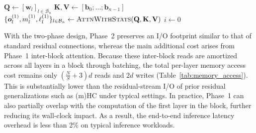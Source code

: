 \begin{algorithm}[t]
    \caption{Two-phase computation for block $n$}
    \label{alg:inference}
    \BlankLine
    $\mathbf{Q} \gets [\bm{w}_l]_{l \in \mathcal{B}_n}$\tcp*{$[S, d]$}
    $\mathbf{K}, \mathbf{V} \gets [\bm{b}_0; \ldots; \bm{b}_{n-1}]$\tcp*{$[n, d]$}
    $\{\bm{o}_l^{(1)}, m_l^{(1)}, \ell_l^{(1)}\}_{l \in \mathcal{B}_n} \gets \textsc{AttnWithStats}(\mathbf{Q}, \mathbf{K}, \mathbf{V})$
    \;
    $i \gets 0$\;
\end{algorithm}

With the two-phase design, Phase~2 preserves an I/O footprint similar to that of standard residual connections, whereas the main additional cost arises from Phase~1 inter-block attention. Because these inter-block reads are amortized across all layers in a block through batching, the total per-layer memory access cost remains only $(\frac{N}{S} + 3)d$ reads and $2d$ writes (Table~\ref{tab:memory_access}). This is substantially lower than the residual-stream I/O of prior residual generalizations such as (m)HC under typical settings. In practice, Phase~1 can also partially overlap with the computation of the first layer in the block, further reducing its wall-clock impact. As a result, the end-to-end inference latency overhead is less than 2\% on typical inference workloads.





